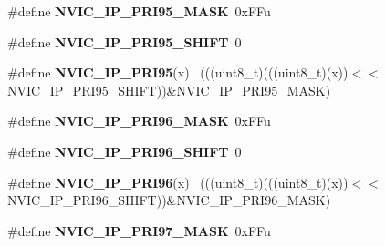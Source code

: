 \begin{DoxyCompactItemize}
\item 
\hypertarget{group___n_v_i_c___register___masks_ga93cdfed4b194416629efde1c2c4f40c4}{}\#define {\bfseries N\+V\+I\+C\+\_\+\+I\+P\+\_\+\+P\+R\+I95\+\_\+\+M\+A\+S\+K}~0x\+F\+Fu\label{group___n_v_i_c___register___masks_ga93cdfed4b194416629efde1c2c4f40c4}

\item 
\hypertarget{group___n_v_i_c___register___masks_gacf337b23c2987790be4ece9da9784d3c}{}\#define {\bfseries N\+V\+I\+C\+\_\+\+I\+P\+\_\+\+P\+R\+I95\+\_\+\+S\+H\+I\+F\+T}~0\label{group___n_v_i_c___register___masks_gacf337b23c2987790be4ece9da9784d3c}

\item 
\hypertarget{group___n_v_i_c___register___masks_ga3cac3f5880eda15a7d984aa2f6a54f6d}{}\#define {\bfseries N\+V\+I\+C\+\_\+\+I\+P\+\_\+\+P\+R\+I95}(x)                                              ~(((uint8\+\_\+t)(((uint8\+\_\+t)(x))$<$$<$N\+V\+I\+C\+\_\+\+I\+P\+\_\+\+P\+R\+I95\+\_\+\+S\+H\+I\+F\+T))\&N\+V\+I\+C\+\_\+\+I\+P\+\_\+\+P\+R\+I95\+\_\+\+M\+A\+S\+K)\label{group___n_v_i_c___register___masks_ga3cac3f5880eda15a7d984aa2f6a54f6d}

\item 
\hypertarget{group___n_v_i_c___register___masks_ga6515e8fd4c5f179b0f435cc29b508948}{}\#define {\bfseries N\+V\+I\+C\+\_\+\+I\+P\+\_\+\+P\+R\+I96\+\_\+\+M\+A\+S\+K}~0x\+F\+Fu\label{group___n_v_i_c___register___masks_ga6515e8fd4c5f179b0f435cc29b508948}

\item 
\hypertarget{group___n_v_i_c___register___masks_gaa629cc32d7ead34fdda701fa682214fe}{}\#define {\bfseries N\+V\+I\+C\+\_\+\+I\+P\+\_\+\+P\+R\+I96\+\_\+\+S\+H\+I\+F\+T}~0\label{group___n_v_i_c___register___masks_gaa629cc32d7ead34fdda701fa682214fe}

\item 
\hypertarget{group___n_v_i_c___register___masks_ga930dfc0cbea66e73d906e6bfbfb44cf5}{}\#define {\bfseries N\+V\+I\+C\+\_\+\+I\+P\+\_\+\+P\+R\+I96}(x)                                              ~(((uint8\+\_\+t)(((uint8\+\_\+t)(x))$<$$<$N\+V\+I\+C\+\_\+\+I\+P\+\_\+\+P\+R\+I96\+\_\+\+S\+H\+I\+F\+T))\&N\+V\+I\+C\+\_\+\+I\+P\+\_\+\+P\+R\+I96\+\_\+\+M\+A\+S\+K)\label{group___n_v_i_c___register___masks_ga930dfc0cbea66e73d906e6bfbfb44cf5}

\item 
\hypertarget{group___n_v_i_c___register___masks_ga77af4871ff3d81585118eb6c14b8936e}{}\#define {\bfseries N\+V\+I\+C\+\_\+\+I\+P\+\_\+\+P\+R\+I97\+\_\+\+M\+A\+S\+K}~0x\+F\+Fu\label{group___n_v_i_c___register___masks_ga77af4871ff3d81585118eb6c14b8936e}


\end{DoxyCompactItemize}

